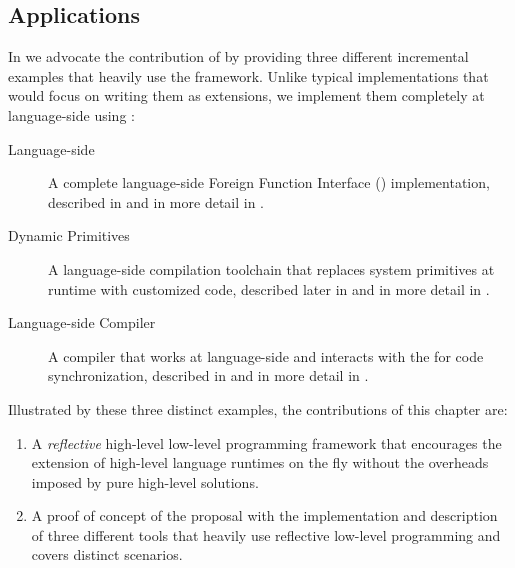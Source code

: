 \subsection{\B Applications}
In  we advocate the contribution of \B by providing three different incremental examples that heavily use the framework.
Unlike typical implementations that would focus on writing them as \VM extensions, we implement them completely at language-side using \B:

\begin{description}
	\item[Language-side \FFI] A complete language-side Foreign Function Interface (\FFI) implementation, described in  and in more detail in .
	\item[Dynamic Primitives] A language-side compilation toolchain that replaces system primitives at runtime with customized code, described later in  and in more detail in . 
	\item[Language-side \JIT Compiler] A \JIT compiler that works at language-side and interacts with the \VM for code synchronization, described in  and in more detail in .
\end{description}

\noindent Illustrated by these three distinct examples, the contributions of this chapter are:
\begin{enumerate} 
	\item A \emph{reflective} high-level low-level programming framework that encourages the extension of high-level language runtimes on the fly without the overheads imposed by pure high-level solutions. 
	\item A proof of concept of the proposal with the implementation and description of three different tools that heavily use reflective low-level programming and covers distinct scenarios.
\end{enumerate}

